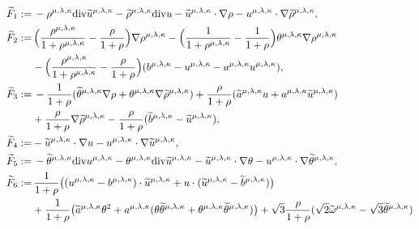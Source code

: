 \documentclass[reqno,11pt]{amsart}
\theoremstyle{plain}
\numberwithin{equation}{section}
\begin{document}
\begin{align*}
\widetilde{F}_1:=&\,-{\rho}^{\mu,\lambda,\kappa}{\rm div}\widetilde{u}^{{\mu,\lambda,\kappa}}-\widetilde{\rho}^{{\mu,\lambda,\kappa}}{\rm div}u
-\widetilde{u}^{{\mu,\lambda,\kappa}}\cdot\nabla\rho-u^{{\mu,\lambda,\kappa}}\cdot\nabla\widetilde{\rho}^{{\mu,\lambda,\kappa}} ,\\
\widetilde{F}_2:=&\,\Big(\frac{\rho^{\mu,\lambda,\kappa}}{1+\rho^{\mu,\lambda,\kappa}}-\frac{\rho }{1+\rho }\Big)
 \nabla\rho^{{\mu,\lambda,\kappa}}-\Big(\frac{1}{1+\rho^{\mu,\lambda,\kappa}}-\frac{1}{1+\rho}\Big)\theta^{{\mu,\lambda,\kappa}} \nabla\rho^{{\mu,\lambda,\kappa}} \\
&-\Big(\frac{\rho^{\mu,\lambda,\kappa}}{1+\rho^{\mu,\lambda,\kappa}}-\frac{\rho }{1+\rho }\Big) ( b^{\mu,\lambda,\kappa}
-u^{\mu,\lambda,\kappa}-a^{\mu,\lambda,\kappa} u^{\mu,\lambda,\kappa}),\nonumber\\
\widetilde{F}_3:=&\,-\frac{1}{1+\rho}(\widetilde{\theta}^{{\mu,\lambda,\kappa}}\nabla\rho
+\theta^{{\mu,\lambda,\kappa}}\nabla\widetilde{\rho}^{{\mu,\lambda,\kappa}})
+\frac{\rho}{1+\rho}(\widetilde{a}^{\mu,\lambda,\kappa} u+a^{\mu,\lambda,\kappa}\widetilde{u}^{\mu,\lambda,\kappa})\nonumber\\
&+\frac{\rho}{1+\rho}\nabla\widetilde{\rho}^{{\mu,\lambda,\kappa}}-\frac{\rho}{1+\rho} (\widetilde{b}^{\mu,\lambda,\kappa}-\widetilde{u}^{\mu,\lambda,\kappa})  ,\\
\widetilde{F}_4:=&-\widetilde{u}^{\mu,\lambda,\kappa}\cdot\nabla u-u^{\mu,\lambda,\kappa}\cdot\nabla\widetilde{u}^{\mu,\lambda,\kappa},\nonumber\\
\widetilde{F}_5:=&\,-\widetilde{\theta}^{{\mu,\lambda,\kappa}}{\rm div}u^{{\mu,\lambda,\kappa}}- {\theta}^{{\mu,\lambda,\kappa}}{\rm div}\widetilde{u}^{{\mu,\lambda,\kappa}}
-\widetilde{u}^{{\mu,\lambda,\kappa}}\cdot\nabla\theta-{u}^{{\mu,\lambda,\kappa}}\cdot\nabla\widetilde{\theta}^{{\mu,\lambda,\kappa}},\\
\widetilde{F}_6:=&\,\frac{1}{1+\rho}\big((u^{\mu,\lambda,\kappa}-b^{\mu,\lambda,\kappa})\cdot\widetilde{u}^{\mu,\lambda,\kappa}
+u\cdot(\widetilde{u}^{\mu,\lambda,\kappa}-\widetilde{b}^{\mu,\lambda,\kappa}) \big) \nonumber\\
&+\frac{1}{1+\rho}\big( \widetilde{a}^{\mu,\lambda,\kappa}\theta^2+a^{\mu,\lambda,\kappa}(\theta\widetilde{\theta}^{\mu,\lambda,\kappa}
+\theta^{\mu,\lambda,\kappa}\widetilde{\theta}^{\mu,\lambda,\kappa})\big) +\sqrt{3}\frac{\rho}{1+\rho}(\sqrt{2}\widetilde{\omega}^{\mu,\lambda,\kappa}
-\sqrt{3}\widetilde\theta^{\mu,\lambda,\kappa})\nonumber\\

\end{align*}
\end{document}
